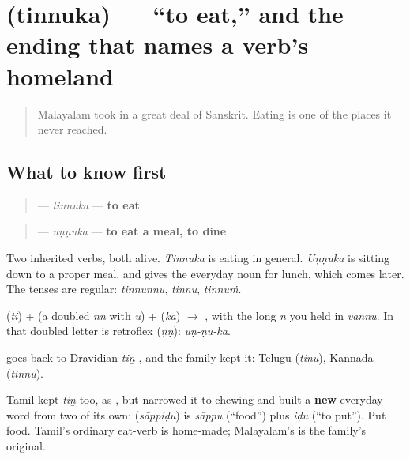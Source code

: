 \section[\texorpdfstring{\ml{തിന്നുക} (tinnuka)}{തിന്നുക (tinnuka)}]{ (tinnuka) — \textquotedblleft{}to eat,\textquotedblright{} and the ending that names a verb's homeland}

\label{lesson:ML-C32-tinnuka}



\begin{quote}
Malayalam took in a great deal of Sanskrit. Eating is one of the places it never reached.
\end{quote}

\subsection*{What to know first}
\begin{quote}
\textbf{} — \emph{tinnuka} — \textbf{to eat}
\end{quote}

\begin{quote}
\textbf{} — \emph{uṇṇuka} — \textbf{to eat a meal, to dine}
\end{quote}

Two inherited verbs, both alive. \emph{Tinnuka} is eating in general. \emph{Uṇṇuka} is sitting down to a proper meal, and gives the everyday noun for lunch, which comes later. The tenses are regular: \emph{tinnunnu}, \emph{tinnu}, \emph{tinnuṁ}.

\begin{sounds}
\textbf{} (\emph{ti}) + \textbf{} (a doubled \emph{nn} with \emph{u}) + \textbf{} (\emph{ka}) $\to$ \textbf{}, with the long \emph{n} you held in \emph{vannu}. In \textbf{} that doubled letter is retroflex \textbf{} (\emph{ṇṇ}): \emph{uṇ-ṇu-ka}.
\end{sounds}

\begin{cousinweb}
\textbf{} goes back to Dravidian \emph{tiṉ-}, and the family kept it: Telugu \textbf{} (\emph{tinu}), Kannada \textbf{} (\emph{tinnu}).

Tamil kept \emph{tiṉ} too, as \textbf{}, but narrowed it to chewing and built a \textbf{new} everyday word from two of its own: \textbf{} (\emph{sāppiḍu}) is \emph{sāppu} (\textquotedblleft{}food\textquotedblright{}) plus \emph{iḍu} (\textquotedblleft{}to put\textquotedblright{}). Put food. Tamil's ordinary eat-verb is home-made; Malayalam's is the family's original.
\end{cousinweb}

